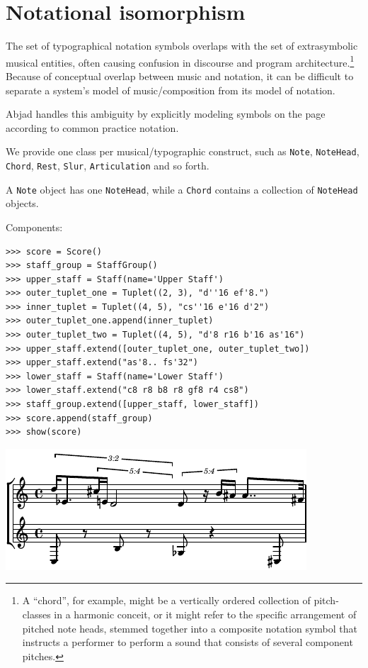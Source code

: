 \section{Notational isomorphism}\label{sec:notational_isomorphism}

The set of typographical notation symbols overlaps with the set of
extrasymbolic musical entities, often causing confusion in discourse and
program architecture.\footnote{A ``chord'', for example, might be a vertically
ordered collection of pitch-classes in a harmonic conceit, or it might refer to
the specific arrangement of pitched note heads, stemmed together into a
composite notation symbol that instructs a performer to perform a sound that
consists of several component pitches.} Because of conceptual overlap between
music and notation, it can be difficult to separate a system’s model of
music/composition from its model of notation.

Abjad handles this ambiguity by explicitly modeling symbols on the page
according to common practice notation.

We provide one class per musical/typographic construct, such as \texttt{Note},
\texttt{NoteHead}, \texttt{Chord}, \texttt{Rest}, \texttt{Slur},
\texttt{Articulation} and so forth.

A \texttt{Note} object has one \texttt{NoteHead}, while a \texttt{Chord}
contains a collection of \texttt{NoteHead} objects.

Components:

\begin{lstlisting}
>>> score = Score()
>>> staff_group = StaffGroup()
>>> upper_staff = Staff(name='Upper Staff')
>>> outer_tuplet_one = Tuplet((2, 3), "d''16 ef'8.")
>>> inner_tuplet = Tuplet((4, 5), "cs''16 e'16 d'2")
>>> outer_tuplet_one.append(inner_tuplet)
>>> outer_tuplet_two = Tuplet((4, 5), "d'8 r16 b'16 as'16")
>>> upper_staff.extend([outer_tuplet_one, outer_tuplet_two])
>>> upper_staff.extend("as'8.. fs'32")
>>> lower_staff = Staff(name='Lower Staff')
>>> lower_staff.extend("c8 r8 b8 r8 gf8 r4 cs8")
>>> staff_group.extend([upper_staff, lower_staff])
>>> score.append(staff_group)
>>> show(score)
\end{lstlisting}

\includegraphics[scale=1.0]{images/notational_isomorphism-1.pdf}


